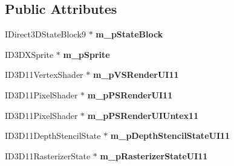 \subsection*{Public Attributes}
\begin{DoxyCompactItemize}
\item 
\hypertarget{class_c_d_x_u_t_dialog_resource_manager_a68ecba684cf15356604fa77dd6ade31f}{I\+Direct3\+D\+State\+Block9 $\ast$ {\bfseries m\+\_\+p\+State\+Block}}\label{class_c_d_x_u_t_dialog_resource_manager_a68ecba684cf15356604fa77dd6ade31f}

\item 
\hypertarget{class_c_d_x_u_t_dialog_resource_manager_a36b8710e919e00692dbfd4683b2529eb}{I\+D3\+D\+X\+Sprite $\ast$ {\bfseries m\+\_\+p\+Sprite}}\label{class_c_d_x_u_t_dialog_resource_manager_a36b8710e919e00692dbfd4683b2529eb}

\item 
\hypertarget{class_c_d_x_u_t_dialog_resource_manager_a61b37a49be0bcc41f2285c0b238e096f}{I\+D3\+D11\+Vertex\+Shader $\ast$ {\bfseries m\+\_\+p\+V\+S\+Render\+U\+I11}}\label{class_c_d_x_u_t_dialog_resource_manager_a61b37a49be0bcc41f2285c0b238e096f}

\item 
\hypertarget{class_c_d_x_u_t_dialog_resource_manager_a103ebd22f6b88723430aa2c5df4b0b82}{I\+D3\+D11\+Pixel\+Shader $\ast$ {\bfseries m\+\_\+p\+P\+S\+Render\+U\+I11}}\label{class_c_d_x_u_t_dialog_resource_manager_a103ebd22f6b88723430aa2c5df4b0b82}

\item 
\hypertarget{class_c_d_x_u_t_dialog_resource_manager_a7728935214c4576ba65b19daf8673d35}{I\+D3\+D11\+Pixel\+Shader $\ast$ {\bfseries m\+\_\+p\+P\+S\+Render\+U\+I\+Untex11}}\label{class_c_d_x_u_t_dialog_resource_manager_a7728935214c4576ba65b19daf8673d35}

\item 
\hypertarget{class_c_d_x_u_t_dialog_resource_manager_a72dbe28648c9d9503deeef5cde1a0924}{I\+D3\+D11\+Depth\+Stencil\+State $\ast$ {\bfseries m\+\_\+p\+Depth\+Stencil\+State\+U\+I11}}\label{class_c_d_x_u_t_dialog_resource_manager_a72dbe28648c9d9503deeef5cde1a0924}

\item 
\hypertarget{class_c_d_x_u_t_dialog_resource_manager_ac0d56cd98dd028460f2f234e501b1ca1}{I\+D3\+D11\+Rasterizer\+State $\ast$ {\bfseries m\+\_\+p\+Rasterizer\+State\+U\+I11}}\label{class_c_d_x_u_t_dialog_resource_manager_ac0d56cd98dd028460f2f234e501b1ca1}


\end{DoxyCompactItemize}
